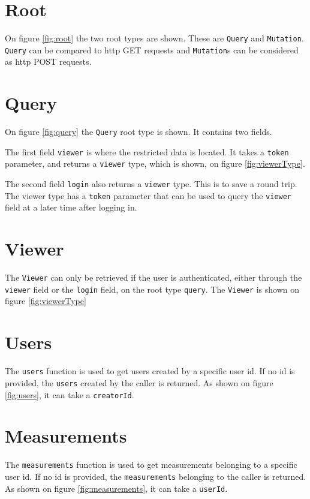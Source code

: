 \section{Root}
\label{sec:root}
On figure \ref{fig:root} the two root types are shown. 
These are \verb+Query+ and \verb+Mutation+. 
\verb+Query+ can be compared to \gls{http} GET requests and \verb+Mutation+s can be considered as \gls{http} POST requests.

\section{Query}
\label{sec:query}
On figure \ref{fig:query} the \verb+Query+ root type is shown. It contains two fields. 

The first field \verb+viewer+ is where the restricted data is located.
It takes a \verb+token+ parameter, and returns a \verb+viewer+ type, which is shown, on figure \ref{fig:viewerType}.

The second field \verb+login+ also returns a \verb+viewer+ type. 
This is to save a round trip.
The viewer type has a \verb+token+ parameter that can be used to query the \verb+viewer+ field at a later time after logging in.

\section{Viewer}
\label{sec:viewer}
The \verb+Viewer+ can only be retrieved if the user is authenticated, either through the \verb+viewer+ field or the \verb+login+ field, on the root type \verb+query+. The \verb+Viewer+ is shown on figure \ref{fig:viewerType}

\section{Users}
The \verb+users+ function is used to get users created by a specific user id. If no id is provided, the \verb+users+ created by the caller is returned. 
As shown on figure \ref{fig:users}, it can take a \verb+creatorId+.

\section{Measurements}
The \verb+measurements+ function is used to get measurements belonging to a specific user id. If no id is provided, the \verb+measurements+ belonging to the caller is returned. 
As shown on figure \ref{fig:measurements}, it can take a \verb+userId+.

